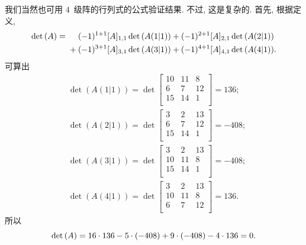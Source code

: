 \documentclass[../libro.tex]{subfiles}
\begin{document}
\begin{example}
    我们当然也可用
    \(4\)~级阵的行列式的公式验证结果.
    不过, 这是复杂的.
    首先, 根据定义,
    \begin{align*}
        \det {(A)}
        = {} &
        \hphantom{{} + {}}
        (-1)^{1+1} [A]_{1,1} \det {(A(1|1))}
        + (-1)^{2+1} [A]_{2,1} \det {(A(2|1))}
        \\
        &
        + (-1)^{3+1} [A]_{3,1} \det {(A(3|1))}
        + (-1)^{4+1} [A]_{4,1} \det {(A(4|1))}.
    \end{align*}
    可算出
    \begin{align*}
        & \det {(A(1|1))}
        = \det {
            \begin{bmatrix}
                10 & 11 & 8  \\
                6  & 7  & 12 \\
                15 & 14 & 1  \\
        \end{bmatrix}}
        = 136;             \\
        & \det {(A(2|1))}
        = \det {
            \begin{bmatrix}
                3  & 2  & 13 \\
                6  & 7  & 12 \\
                15 & 14 & 1  \\
        \end{bmatrix}}
        = -408;            \\
        & \det {(A(3|1))}
        = \det {
            \begin{bmatrix}
                3  & 2  & 13 \\
                10 & 11 & 8  \\
                15 & 14 & 1  \\
        \end{bmatrix}}
        = -408;            \\
        & \det {(A(4|1))}
        = \det {
            \begin{bmatrix}
                3  & 2  & 13 \\
                10 & 11 & 8  \\
                6  & 7  & 12 \\
        \end{bmatrix}}
        = 136.
    \end{align*}
    所以
    \begin{equation*}
        \det {(A)}
        = 16 \cdot 136 - 5 \cdot (-408)
        + 9 \cdot (-408) - 4 \cdot 136
        = 0.
        \qedhere
    \end{equation*}
\end{example}
\end{document}
